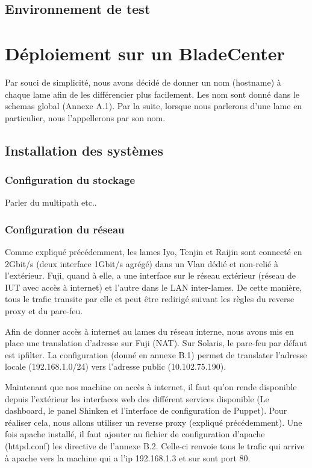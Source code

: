 \documentclass{report}
\begin{document}
\subsection{Environnement de test}


\section{Déploiement sur un BladeCenter}

Par souci de simplicité, nous avons décidé de donner un nom (hostname) à chaque lame afin de les différencier plus facilement. Les nom sont donné dans le schemas global (Annexe A.1). Par la suite, lorsque nous parlerons d'une lame en particulier, nous l'appellerons par son nom.

\subsection{Installation des systèmes}

\subsubsection{Configuration du stockage}
Parler du multipath etc..

\subsubsection{Configuration du réseau}
Comme expliqué précédemment, les lames Iyo, Tenjin et Raijin sont connecté en 2Gbit/s (deux interface 1Gbit/s agrégé) dans un Vlan dédié et non-relié à l'extérieur. Fuji, quand à elle, a une interface sur le réseau extérieur (réseau de IUT avec accès à internet) et l'autre dans le LAN inter-lames. De cette manière, tous le trafic transite par elle et peut être redirigé suivant les règles du reverse proxy et du pare-feu. 

Afin de donner accès à internet au lames du réseau interne, nous avons mis en place une translation d'adresse sur Fuji (NAT). Sur Solaris, le pare-feu par défaut est ipfilter. La configuration (donné en annexe B.1) permet de translater l'adresse locale (192.168.1.0/24) vers l'adresse public (10.102.75.190).

Maintenant que nos machine on accès à internet, il faut qu'on rende disponible depuis l'extérieur les interfaces web des différent services disponible (Le dashboard, le panel Shinken et l'interface de configuration de Puppet). Pour réaliser cela, nous allons utiliser un reverse proxy (expliqué précédemment). Une fois apache installé, il faut ajouter au fichier de configuration d'apache (httpd.conf) les directive de l'annexe B.2. Celle-ci renvoie tous le trafic qui arrive à apache vers la machine qui a l'ip 192.168.1.3 et sur sont port 80.
\end{document}
